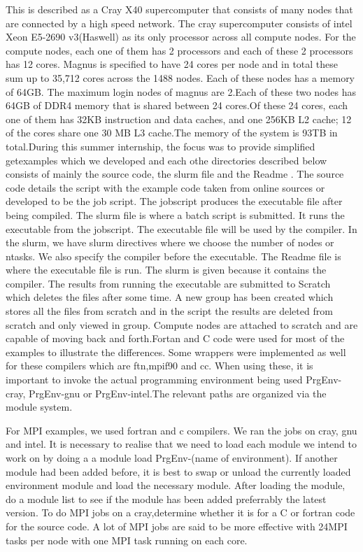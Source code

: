 \begin{Document}
{

This is described as a Cray X40 supercomputer that consists of many nodes that are connected by a high speed network. The cray supercomputer consists of intel Xeon E5-2690 v3(Haswell) as its only processor across all compute nodes. For the compute nodes, each one of them has 2 processors and each of these 2 processors has 12 cores.
Magnus is specified to have 24 cores per node and in total these sum up to 35,712 cores across the 1488 nodes. Each of these nodes has a memory of 64GB. The maximum login nodes of magnus are 2.Each of these two nodes has 64GB of DDR4 memory that is shared between 24 cores.Of these 24 cores, each one of them has 32KB instruction and data caches, and one 256KB L2 cache; 12 of the cores share one 30 MB L3 cache.The memory of the system is 93TB in total.During this summer internship, the focus was to provide simplified getexamples which we developed and each othe directories described below consists of mainly the source code, the slurm file and the Readme . The source code details the script with the example code taken from online sources or developed to be the job script. The jobscript produces the executable file after being compiled. The slurm file is where a batch script is submitted. It runs the executable from the jobscript. The executable file will be used by the compiler. In the slurm, we have slurm directives where we choose the number of nodes or ntasks. We also specify the compiler before the executable. The Readme file is where the executable file is run. The slurm is given because it contains the compiler. The results from running the executable are submitted to Scratch which deletes the files after some time. A new group has been created which stores all the files from scratch and in the script the results are deleted from scratch and only viewed in group. Compute nodes are attached to scratch and are capable of moving back and forth.$
$Fortan and C code were used for most of the examples to illustrate the differences. Some wrappers were implemented as well for these compilers which are ftn,mpif90 and cc. When using these, it is important to invoke the actual programming environment being used PrgEnv-cray, PrgEnv-gnu or PrgEnv-intel.The relevant paths are organized via the module system.




For MPI examples, we used fortran and c compilers. We ran the jobs on cray, gnu and intel.
It is necessary to realise that we need to load each module we intend to work on by doing a a module load PrgEnv-(name of environment). 
If another module had been added before, it is best to swap or unload the currently loaded environment module and load the necessary module.
After loading the module, do a module list to see if the module has been added preferrably the latest version.
To do MPI jobs on a cray,determine whether it is for a C or fortran code for the source code.
A lot of MPI jobs are said to be more effective with 24MPI tasks per node with one MPI task running on each core.

}
\end{Document}
